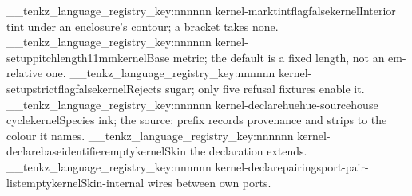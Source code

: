 \__tenkz_language_registry_key:nnnnnn {kernel-mark}{tint}{flag}{false}{kernel}{Interior tint under an enclosure's contour; a bracket takes none.}
\__tenkz_language_registry_key:nnnnnn {kernel-setup}{pitch}{length}{11mm}{kernel}{Base metric; the default is a fixed length, not an em-relative one.}
\__tenkz_language_registry_key:nnnnnn {kernel-setup}{strict}{flag}{false}{kernel}{Rejects sugar; only five refusal fixtures enable it.}
\__tenkz_language_registry_key:nnnnnn {kernel-declare}{hue}{hue-source}{house cycle}{kernel}{Species ink; the source: prefix records provenance and strips to the colour it names.}
\__tenkz_language_registry_key:nnnnnn {kernel-declare}{base}{identifier}{empty}{kernel}{Skin the declaration extends.}
\__tenkz_language_registry_key:nnnnnn {kernel-declare}{pairings}{port-pair-list}{empty}{kernel}{Skin-internal wires between own ports.}

